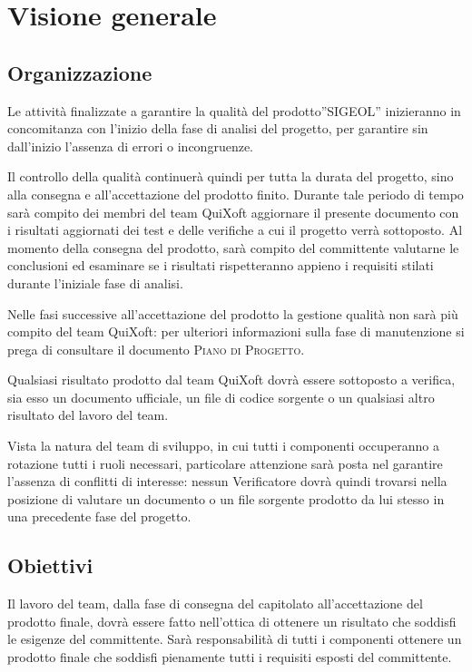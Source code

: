 \documentclass[11pt,a4paper]{article}
\begin{document}
\section{Visione generale}
\subsection{Organizzazione} 
Le attività finalizzate a garantire la qualità del prodotto''SIGEOL'' inizieranno in concomitanza con l'inizio della fase di analisi del progetto, per garantire sin dall'inizio l'assenza di errori o incongruenze.

Il controllo della qualità continuerà quindi per tutta la durata del progetto, sino alla consegna e all'accettazione del prodotto finito. Durante tale periodo di tempo sarà compito dei membri del team QuiXoft aggiornare il presente documento con i risultati aggiornati dei test e delle verifiche a cui il progetto verrà sottoposto. Al momento della consegna del prodotto, sarà compito del committente valutarne le conclusioni ed esaminare se i risultati rispetteranno appieno i requisiti stilati durante l'iniziale fase di analisi.

Nelle fasi successive all'accettazione del prodotto la gestione qualità non sarà più compito del team QuiXoft: per ulteriori informazioni sulla fase di manutenzione si prega di consultare il documento \textsc{Piano di Progetto}.

Qualsiasi risultato prodotto dal team QuiXoft dovrà essere sottoposto a verifica, sia esso un documento ufficiale, un file di codice sorgente o un qualsiasi altro risultato del lavoro del team.

Vista la natura del team di sviluppo, in cui tutti i componenti occuperanno a rotazione tutti i ruoli necessari, particolare attenzione sarà posta nel garantire l'assenza di conflitti di interesse: nessun Verificatore dovrà quindi trovarsi nella posizione di valutare un documento o un file sorgente prodotto da lui stesso in una precedente fase del progetto.

\subsection{Obiettivi}
Il lavoro del team, dalla fase di consegna del capitolato all'accettazione del prodotto finale, dovrà essere fatto nell'ottica di ottenere un risultato che soddisfi le esigenze del committente. Sarà responsabilità di tutti i componenti ottenere un prodotto finale che soddisfi pienamente tutti i requisiti esposti del committente.
\end{document}
